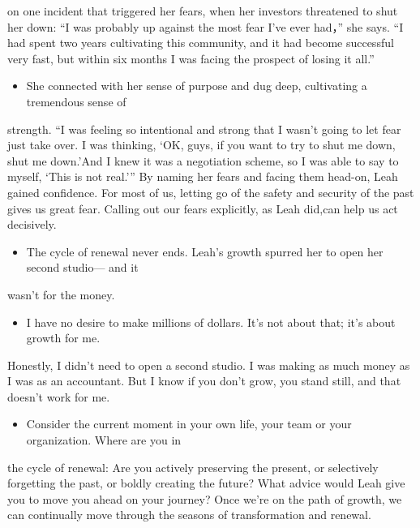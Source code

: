 \documentclass[UTF8,11pt]{ctexart}
\begin{document}
on one incident that triggered her fears, when her investors threatened to shut her down: “I was probably up against the most fear I’ve ever had，” she says. “I had spent two years cultivating this community, and it had become successful very fast, but within six months I was facing the prospect of losing it all.”


\begin{itemize}[leftmargin=2em,itemsep=.2em,topsep=.4em]\item[L.] She connected with her sense of purpose and dug deep, cultivating a tremendous sense of
\end{itemize}

strength. “I was feeling so intentional and strong that I wasn’t going to let fear just take over. I was thinking, ‘OK, guys, if you want to try to shut me down, shut me down.’And I knew it was a negotiation scheme, so I was able to say to myself, ‘This is not real.’” By naming her fears and facing them head-on, Leah gained confidence. For most of us, letting go of the safety and security of the past gives us great fear. Calling out our fears explicitly, as Leah did,can help us act decisively.


\begin{itemize}[leftmargin=2em,itemsep=.2em,topsep=.4em]\item[M.] The cycle of renewal never ends. Leah’s growth spurred her to open her second studio— and it
\end{itemize}

wasn’t for the money.


\begin{itemize}[leftmargin=2em,itemsep=.2em,topsep=.4em]\item[N.] I have no desire to make millions of dollars. It’s not about that; it’s about growth for me.
\end{itemize}

Honestly, I didn’t need to open a second studio. I was making as much money as I was as an accountant. But I know if you don’t grow, you stand still, and that doesn’t work for me.


\begin{itemize}[leftmargin=2em,itemsep=.2em,topsep=.4em]\item[O.] Consider the current moment in your own life, your team or your organization. Where are you in
\end{itemize}

the cycle of renewal: Are you actively preserving the present, or selectively forgetting the past, or boldly creating the future? What advice would Leah give you to move you ahead on your journey? Once we’re on the path of growth, we can continually move through the seasons of transformation and renewal.
\end{document}
